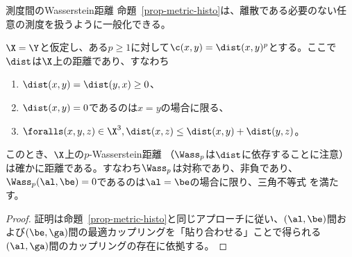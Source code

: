 \begin{rem1}{測度間のWasserstein距離}
命題~\ref{prop-metric-histo}は、離散である必要のない任意の測度を扱うように一般化できる。

\begin{prop}\label{prop-metric-measure}
$\X=\Y$と仮定し、ある$p \geq 1$に対して$\c(x,y)=\dist(x,y)^p$とする。ここで$\dist$は$\X$上の距離であり、すなわち
\begin{enumerate}[label=(\roman*)]
	\item  $\dist(x,y) = \dist(y,x) \geq 0$、
	\item  $\dist(x,y)=0$であるのは$x=y$の場合に限る、
	\item  $\foralls (x,y,z) \in \X^3, \dist(x,z) \leq \dist(x,y)+\dist(y,z)$。
\end{enumerate}
このとき、$\X$上の$p$-Wasserstein距離
（$\Wass_p$は$\dist$に依存することに注意）は確かに距離である。すなわち$\Wass_p$は対称であり、非負であり、$\Wass_p(\al,\be)=0$であるのは$\al = \be$の場合に限り、三角不等式
を満たす。
\end{prop}
\begin{proof}
証明は命題~\ref{prop-metric-histo}と同じアプローチに従い、$(\al,\be)$間および$(\be,\ga)$間の最適カップリングを「貼り合わせる」ことで得られる$(\al,\ga)$間のカップリングの存在に依拠する。
\end{proof}
\end{rem1}


